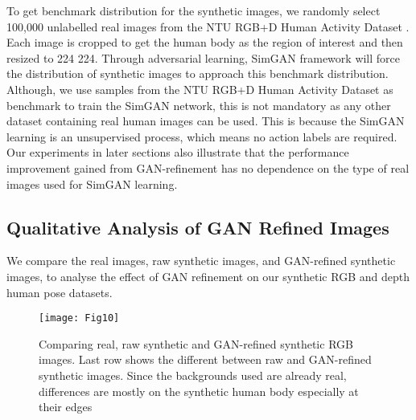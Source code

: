 \documentclass[twocolumn]{svjour3}          \smartqed  \usepackage{graphicx}
\begin{document}
To get benchmark distribution for the synthetic images, we randomly select 100,000 unlabelled real images from the NTU RGB+D Human Activity Dataset \citep{shahroudy2016ntu}. Each image is cropped to get the human body as the region of interest and then resized to 224  224. Through adversarial learning, SimGAN framework \citep{shrivastava2016learning} will force the distribution of synthetic images to approach this benchmark distribution. Although, we use samples from the NTU RGB+D Human Activity Dataset as benchmark to train the SimGAN network, this is not mandatory as any other dataset containing real human images can be used. This is because the SimGAN learning is an unsupervised process, which means no action labels are required. Our experiments in later sections also illustrate that the performance improvement gained from GAN-refinement has no dependence on the type of real images used for SimGAN learning.


\subsection{Qualitative Analysis of GAN Refined Images} 
\label{section:GAN_analysis}

We compare the real images, raw synthetic images, and GAN-refined synthetic images, to analyse the effect of GAN refinement on our synthetic RGB and depth human pose datasets.

\begin{figure}[t]
\centering
\texttt{[image: Fig10]}
\caption{Comparing real, raw synthetic and GAN-refined synthetic RGB images. Last row shows the different between raw and GAN-refined synthetic images. Since the backgrounds used are already real, differences are mostly on the synthetic human body especially at their edges}
\label{fig:rgb_GAN_compare}
\vspace{-1mm}
\end{figure}
\end{document}
